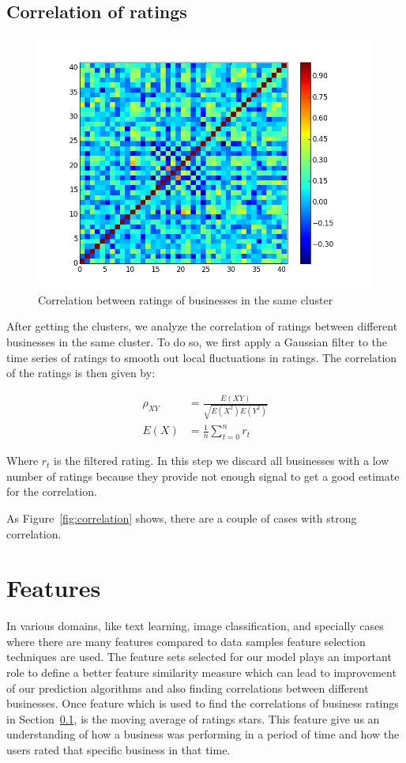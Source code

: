 \documentclass{vldb}
\begin{document}
\subsection{Correlation of ratings}
\label{sec:correlation_of_ratings}
\begin{figure}
\centering
\includegraphics[width=\columnwidth]{cov_cluster_28}
\caption{Correlation between ratings of businesses in the same cluster}
\label{fig:covmat}
\end{figure}
After getting the clusters, we analyze the correlation of ratings between different businesses in the same cluster.
To do so, we first apply a Gaussian filter to the time series of ratings to smooth out local fluctuations in ratings. The correlation of the ratings is then given by:

\begin{align*}
    \rho_{XY} &= \frac{E(XY)}{\sqrt{E(X^2) E(Y^2)}} \\
    E(X) &= \frac{1}{n} \sum_{t = 0}^{n} r_t
\end{align*}

Where $r_t$ is the filtered rating.
In this step we discard all businesses with a low number of ratings because they provide not enough signal to get a good estimate for the correlation.

As Figure~\ref{fig:correlation} shows, there are a couple of cases with strong correlation.


\section{Features}
In various domains, like text learning, image classification, and specially cases where there are many features compared to data samples feature selection techniques are used. The feature sets selected for our model plays an important role to define a better feature similarity measure which can lead to improvement of our prediction algorithms and also finding correlations between different businesses.
Once feature which is used to find the correlations of business ratings in Section~\ref{sec:correlation_of_ratings}, is the moving average of ratings stars. This feature give us an understanding of how a business was performing in a period of time and how the users rated that specific business in that time.
\end{document}
